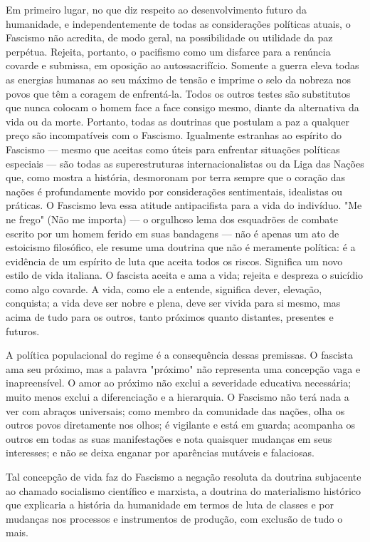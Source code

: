 \documentclass[12pt]{article}
\begin{document}
Em primeiro lugar, no que diz respeito ao desenvolvimento futuro da humanidade, e independentemente de todas as considerações políticas atuais, o Fascismo não acredita, de modo geral, na possibilidade ou utilidade da paz perpétua. Rejeita, portanto, o pacifismo como um disfarce para a renúncia covarde e submissa, em oposição ao autossacrifício. Somente a guerra eleva todas as energias humanas ao seu máximo de tensão e imprime o selo da nobreza nos povos que têm a coragem de enfrentá-la. Todos os outros testes são substitutos que nunca colocam o homem face a face consigo mesmo, diante da alternativa da vida ou da morte. Portanto, todas as doutrinas que postulam a paz a qualquer preço são incompatíveis com o Fascismo. Igualmente estranhas ao espírito do Fascismo — mesmo que aceitas como úteis para enfrentar situações políticas especiais — são todas as superestruturas internacionalistas ou da Liga das Nações que, como mostra a história, desmoronam por terra sempre que o coração das nações é profundamente movido por considerações sentimentais, idealistas ou práticas. O Fascismo leva essa atitude antipacifista para a vida do indivíduo. "Me ne frego" (Não me importa) — o orgulhoso lema dos esquadrões de combate escrito por um homem ferido em suas bandagens — não é apenas um ato de estoicismo filosófico, ele resume uma doutrina que não é meramente política: é a evidência de um espírito de luta que aceita todos os riscos. Significa um novo estilo de vida italiana. O fascista aceita e ama a vida; rejeita e despreza o suicídio como algo covarde. A vida, como ele a entende, significa dever, elevação, conquista; a vida deve ser nobre e plena, deve ser vivida para si mesmo, mas acima de tudo para os outros, tanto próximos quanto distantes, presentes e futuros.

A política populacional do regime é a consequência dessas premissas. O fascista ama seu próximo, mas a palavra "próximo" não representa uma concepção vaga e inapreensível. O amor ao próximo não exclui a severidade educativa necessária; muito menos exclui a diferenciação e a hierarquia. O Fascismo não terá nada a ver com abraços universais; como membro da comunidade das nações, olha os outros povos diretamente nos olhos; é vigilante e está em guarda; acompanha os outros em todas as suas manifestações e nota quaisquer mudanças em seus interesses; e não se deixa enganar por aparências mutáveis e falaciosas.

Tal concepção de vida faz do Fascismo a negação resoluta da doutrina subjacente ao chamado socialismo científico e marxista, a doutrina do materialismo histórico que explicaria a história da humanidade em termos de luta de classes e por mudanças nos processos e instrumentos de produção, com exclusão de tudo o mais.
\end{document}
